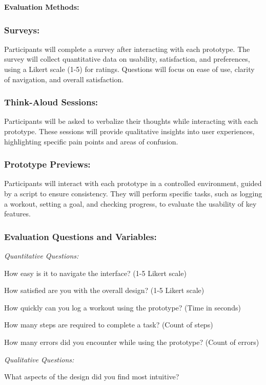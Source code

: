 \documentclass[
	letterpaper, %
]{jdf}
\begin{document}
\textbf{Evaluation Methods:}
\subsubsection{Surveys:} 

Participants will complete a survey after interacting with each prototype. The survey will collect quantitative data on usability, satisfaction, and preferences, using a Likert scale (1-5) for ratings. Questions will focus on ease of use, clarity of navigation, and overall satisfaction.

\subsubsection{Think-Aloud Sessions:}

Participants will be asked to verbalize their thoughts while interacting with each prototype. These sessions will provide qualitative insights into user experiences, highlighting specific pain points and areas of confusion.

\subsubsection{Prototype Previews:}

Participants will interact with each prototype in a controlled environment, guided by a script to ensure consistency. They will perform specific tasks, such as logging a workout, setting a goal, and checking progress, to evaluate the usability of key features.

\subsubsection{Evaluation Questions and Variables:}
\textit{Quantitative Questions:}

How easy is it to navigate the interface? (1-5 Likert scale)

How satisfied are you with the overall design? (1-5 Likert scale)

How quickly can you log a workout using the prototype? (Time in seconds)

How many steps are required to complete a task? (Count of steps)

How many errors did you encounter while using the prototype? (Count of errors)

\textit{Qualitative Questions:}

What aspects of the design did you find most intuitive?
\end{document}
